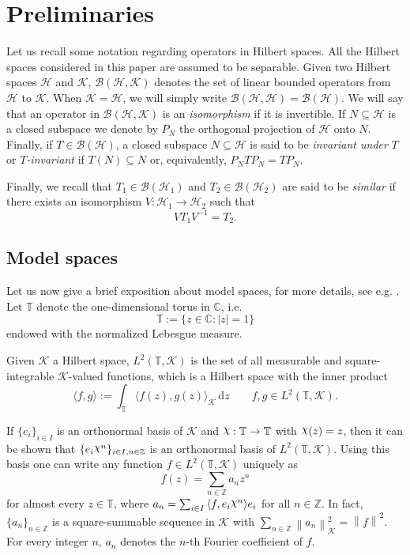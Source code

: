 \documentclass[a4paper,12pt]{amsart}
\def\cB{{\mathcal{B}}}
\def\C{{\mathbb{C}}}
\def\d{\,{\mathrm{d}}}
\def\HH{{\mathcal{H}}}
\def\KK{{\mathcal{K}}}
\def\T{{\mathbb{T}}}
\def\Z{{\mathbb{Z}}}
\DeclareRobustCommand{\rchi}{{\mathpalette\irchi\relax}}
\newcommand{\irchi}[2]{\raisebox{\depth}{$#1\chi$}} %
\newcommand{\norm}[1]{{\left\|{#1}\right\|}}
\newcommand{\abs}[1]{{\left|{#1}\right|}}
\newcommand{\scal}[1]{{\langle{#1}\rangle}}
\theoremstyle{definition}
\begin{document}
\section{Preliminaries}\label{Pre}

Let us recall some notation regarding operators in Hilbert spaces. All the Hilbert spaces considered in this paper are assumed to be separable. Given two Hilbert spaces $\HH$ and $\KK$, $\cB(\mathcal H,\KK)$ denotes the set of linear bounded operators from $\HH$ to $\KK$.  When $\KK=\HH$, we will simply write $\cB(\mathcal H,\HH)=\cB(\HH)$. 
We will say that an operator in $\cB(\mathcal H,\KK)$ is an {\em isomorphism}
if it is invertible.
If $N\subseteq\mathcal H$ is a closed subspace we denote by $P_N$ the orthogonal projection of $\HH$ onto $N$. Finally, if $T\in\mathcal B(\mathcal H)$, a closed subspace $N\subseteq\mathcal H$ is said to be {\em invariant under} $T$ or $T${\em-invariant} if $T(N)\subseteq N$ or, equivalently, $P_NTP_N=TP_N$.


Finally, we recall that $T_1\in\mathcal B(\HH_1)$ and $T_2\in\mathcal B(\HH_2)$ are said to be {\em similar} if there exists an isomorphism $V:\HH_1\to\HH_2$ such that
\begin{equation*}
VT_1V^{-1}=T_2.
\end{equation*}

\subsection{Model spaces}
Let us now give a brief exposition about model spaces, for more details, see e.g. \cite[Lecture $\S$VI]{H}. Let $\T$ denote the one-dimensional torus in $\C$, i.e. 
\begin{equation*}
\T:=\{z\in\C:\abs{z}=1\}
\end{equation*}
endowed with the normalized Lebesgue measure.

Given $\KK$ a Hilbert space, $L^2(\T,\KK)$ is the set of all measurable and square-integrable $\KK$-valued functions, which is a Hilbert space with the inner product
\begin{equation*}
\scal{f,g}:=\int_\T\scal{f(z),g(z)}_\KK\d z\qquad f,g\in L^2(\T,\KK).
\end{equation*}

If $\{e_i\}_{i\in I}$ is an orthonormal basis of $\KK$ and $\rchi:\T\to\T$ with $\rchi(z)=z$, then it can be shown that $\{e_i\rchi^n\}_{i\in I,n\in\Z}$ is an orthonormal basis of $L^2(\T,\KK)$. Using this basis one can write any function $f\in L^2(\T,\KK)$ uniquely as 
\begin{equation*}
f(z)=\sum_{n\in\Z}a_nz^n
\end{equation*}
for almost every $z\in\T$, where $a_n=\sum_{i\in I}\scal{f,e_i\rchi^n}e_i$ for all $n \in \Z$. In fact, $\{a_n\}_{n\in\Z}$ is a square-summable sequence in $\KK$ with $\sum_{n\in\Z}\norm{a_n}_{\KK}^2=\norm{f}^2$. For every integer $n$, $a_n$
denotes the
$n$-th Fourier coefficient of $f$.
\end{document}
